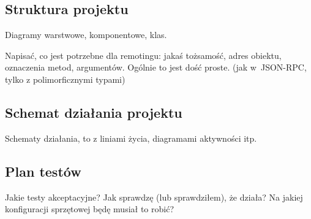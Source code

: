 \subsection{Struktura projektu}
Diagramy warstwowe, komponentowe, klas.

Napisać, co jest potrzebne dla remotingu: jakaś tożsamość, adres obiektu, oznaczenia metod, argumentów. Ogólnie to jest dość proste. (jak w~JSON-RPC, tylko z polimorficznymi typami)

%
%
%
%
%
%
%
%
%
%

\subsection{Schemat działania projektu}
Schematy działania, to z liniami życia, diagramami aktywności itp.

\subsection{Plan testów}
Jakie testy akceptacyjne? Jak sprawdzę (lub sprawdziłem), że działa? Na jakiej konfiguracji sprzętowej będę musiał to robić?

